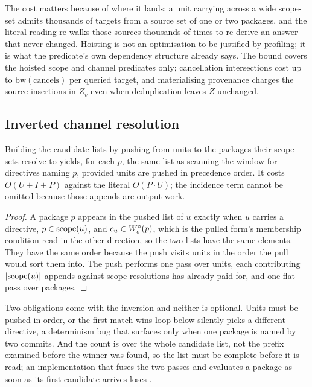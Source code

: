 The cost matters because of where it lands: a unit carrying \code{\^{}\^{}}
across a wide scope-set admits thousands of targets from a source set of one or
two packages, and the literal reading re-walks those sources thousands of times
to re-derive an answer that never changed. Hoisting is not an optimisation to
be justified by profiling; it is what the predicate's own dependency structure
already says. The bound covers the hoisted scope and channel predicates only;
cancellation intersections cost up to $\mathrm{bw}(\mathrm{cancels})$ per
queried target, and materialising provenance charges the source insertions in
$Z_v$ even when deduplication leaves $Z$ unchanged.

\subsection{Inverted channel resolution}

\begin{proposition}[inversion]
\label{prop:invert}
Building the candidate lists by pushing from units to the packages their
scope-sets resolve to yields, for each $p$, the same list as scanning the
window for directives naming $p$, provided units are pushed in 
precedence order. It costs $O(U + I + P)$ against the literal $O(P \cdot U)$; the incidence term cannot be omitted because those appends are output work.
\end{proposition}

\begin{proof}
A package $p$ appears in the pushed list of $u$ exactly when $u$ carries a
 directive, $p \in \mathrm{scope}(u)$, and $c_{u} \in W^{\circ}_{\sigma}(p)$,
which is the pulled form's membership condition read in the other
direction, so the two lists have the same elements. They have the same order
because the push visits units in the order the pull would sort them into.
The push performs one pass over units, each contributing $|\mathrm{scope}(u)|$
appends against scope resolutions  has already paid for, and one
flat pass over packages.
\end{proof}

Two obligations come with the inversion and neither is optional. Units must be
pushed in  order, or the first-match-wins loop below silently picks
a different directive, a determinism bug that surfaces only when one package
is named by two commits. And the  count is over the whole candidate
list, not the prefix examined before the winner was found, so the list must be
complete before it is read; an implementation that fuses the two passes and
evaluates a package as soon as its first candidate arrives loses .

